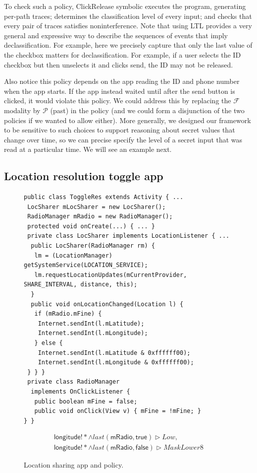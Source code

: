 \documentclass{llncs}
\newcommand{\code}[1]{\textsf{#1}} %
\newcommand{\toolname}{ClickRelease\xspace}
\newcommand{\tfuture}{\mathcal{F}}
\newcommand{\tpast}{\mathcal{P}}
\newcommand{\tlast}[2]{\textit{last}(#1, #2)}
\begin{document}
To check such a policy, \toolname{} symbolic executes the program,
generating per-path traces; determines the classification level of every input; and
checks that every pair of traces satisfies noninterference.
Note that using LTL provides a very general and
expressive way to describe the sequences of events that imply
declassification. For example, here we precisely capture that
only the last value of the checkbox matters for declassification. For
example, if a user selects the ID checkbox but then unselects it
and clicks send, the ID may not be released.

Also notice this policy depends on the app reading the ID
and phone number when the app starts. If the app instead
waited until after the send button is clicked, it would violate this
policy. We could address this by replacing the $\tfuture$ modality by
$\tpast$ (past) in the policy (and we could form a disjunction of the
two policies if we wanted to allow either). More generally, we
designed our framework to be sensitive to such choices to
support  reasoning about secret
values that change over time, so we can precise specify the level of a
secret input that was read at a particular time. We will see an
example next.

\subsection{Location resolution toggle app}

\begin{figure}[t]
\centering
\begin{lstlisting}[name=Ex]
public class ToggleRes extends Activity { ...
 LocSharer mLocSharer = new LocSharer();
 RadioManager mRadio = new RadioManager();
 protected void onCreate(...) { ... }
 private class LocSharer implements LocationListener { ... 
  public LocSharer(RadioManager rm) {
   lm = (LocationManager) getSystemService(LOCATION_SERVICE);
   lm.requestLocationUpdates(mCurrentProvider, SHARE_INTERVAL, distance, this);
  }
  public void onLocationChanged(Location l) {
   if (mRadio.mFine) {
    Internet.sendInt(l.mLatitude);
    Internet.sendInt(l.mLongitude);
   } else {
    Internet.sendInt(l.mLatitude & 0xffffff00);
    Internet.sendInt(l.mLongitude & 0xffffff00);
 } } }
 private class RadioManager
  implements OnClickListener {
   public boolean mFine = false;
   public void onClick(View v) { mFine = !mFine; }
} }
\end{lstlisting}
  \begin{displaymath}
    \begin{array}{ll}
    \code{longitude}!\ast \wedge
    \tlast{\code{mRadio}}{\code{true}} \rhd
    \textit{Low}, \\
    \code{longitude}!\ast \wedge
    \tlast{\code{mRadio}}{\code{false}} \rhd
    \textit{MaskLower8}
    \end{array}
  \end{displaymath}
\caption{Location sharing app and policy.}
\label{fig:app-loc-toggle}
\end{figure}
\end{document}
